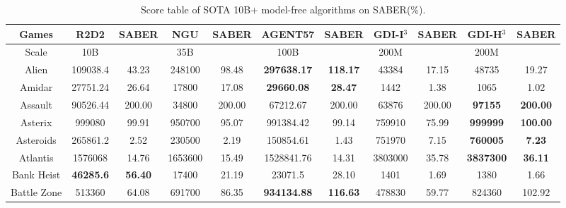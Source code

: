 \documentclass[nohyperref]{article}
\theoremstyle{plain}
\begin{document}
\begin{table}[!hb]
\footnotesize
\begin{center}
\caption{Score table of SOTA  10B+ model-free algorithms on SABER(\%).}
\label{Tab:Score table of SOTA  10B+ model-free algorithms on SABER.}
\setlength{\tabcolsep}{1.0pt}
\begin{tabular}{ |c| c c| c c| c c| c c| c c| }
\hline
 Games & R2D2 & SABER & NGU & SABER & AGENT57 & SABER & GDI-I$^3$ & SABER & GDI-H$^3$ & SABER\\
\hline
Scale  & 10B   &        & 35B &         & 100B     &        & 200M & &  200M   & \\
\hline
 Alien              & 109038.4          & 43.23             & 248100          & 98.48          & \textbf{297638.17}   &\textbf{118.17}           &43384             &17.15              &48735  &19.27        \\
 Amidar             & 27751.24          & 26.64             & 17800           & 17.08          & \textbf{29660.08}    &\textbf{28.47}            &1442              &1.38               &1065              &1.02     \\
 Assault            & 90526.44          & 200.00            & 34800           & 200.00         & 67212.67             &200.00                    &63876             &200.00             &\textbf{97155}     &\textbf{ 200.00}  \\
 Asterix            & 999080            & 99.91             & 950700          & 95.07          & 991384.42            &99.14                     &759910            &75.99              &\textbf{999999}     &\textbf{100.00}\\
 Asteroids          & 265861.2          & 2.52              & 230500          & 2.19           & 150854.61            &1.43                      &751970            &7.15               &\textbf{760005}     &\textbf{7.23}    \\
 Atlantis           & 1576068           & 14.76             & 1653600         & 15.49          & 1528841.76           &14.31                     &3803000           &35.78              &\textbf{3837300}    &\textbf{36.11}            \\
 Bank Heist         & \textbf{46285.6}  & \textbf{56.40}    & 17400           & 21.19          & 23071.5              &28.10                     &1401              &1.69               &1380       &1.66\\
 Battle Zone        & 513360            & 64.08             & 691700          & 86.35          & \textbf{934134.88}   &\textbf{116.63}           &478830            &59.77              &824360     &102.92  \\

\end{tabular}
\end{center}
\end{table}
\end{document}
